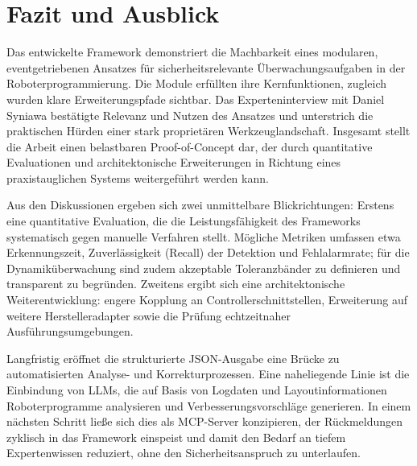 \chapter{Fazit und Ausblick}
\label{cap:Fazit}

Das entwickelte Framework demonstriert die Machbarkeit eines modularen,
eventgetriebenen Ansatzes für sicherheitsrelevante Überwachungsaufgaben in der
Roboterprogrammierung. Die Module erfüllten ihre Kernfunktionen, zugleich wurden
klare Erweiterungspfade sichtbar. Das Experteninterview mit Daniel Syniawa
bestätigte Relevanz und Nutzen des Ansatzes und unterstrich die praktischen
Hürden einer stark proprietären Werkzeuglandschaft. Insgesamt stellt die Arbeit
einen belastbaren Proof-of-Concept dar, der durch quantitative Evaluationen und
architektonische Erweiterungen in Richtung eines praxistauglichen Systems
weitergeführt werden kann.

Aus den Diskussionen ergeben sich zwei unmittelbare Blickrichtungen:
Erstens eine quantitative Evaluation, die die Leistungsfähigkeit des
Frameworks systematisch gegen manuelle Verfahren stellt. Mögliche Metriken
umfassen etwa Erkennungszeit, Zuverlässigkeit (Recall) der Detektion und
Fehlalarmrate; für die Dynamiküberwachung sind zudem akzeptable Toleranzbänder
zu definieren und transparent zu begründen. Zweitens ergibt sich eine
architektonische Weiterentwicklung: engere Kopplung an
Controllerschnittstellen, Erweiterung auf weitere Herstelleradapter sowie die
Prüfung echtzeitnaher Ausführungsumgebungen.

Langfristig eröffnet die strukturierte JSON-Ausgabe eine Brücke zu
automatisierten Analyse- und Korrekturprozessen. Eine naheliegende Linie ist die
Einbindung von LLMs, die auf Basis von Logdaten und
Layoutinformationen Roboterprogramme analysieren und Verbesserungsvorschläge
generieren. In einem nächsten Schritt ließe sich dies als MCP-Server
konzipieren, der Rückmeldungen zyklisch in das Framework einspeist und damit den
Bedarf an tiefem Expertenwissen reduziert, ohne den Sicherheitsanspruch zu
unterlaufen.
